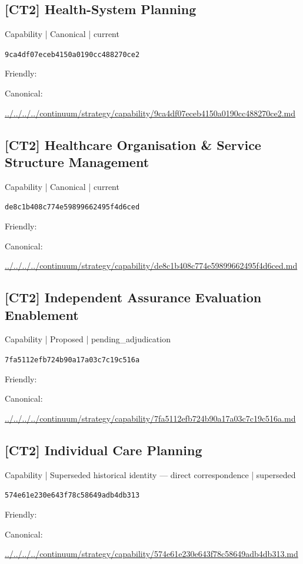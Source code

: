 \documentclass[10pt,a4paper]{article}
\begin{document}
\subsection*{[CT2] Health-System Planning}
{\small Capability | Canonical | current}\par
\texttt{9ca4df07eceb4150a0190cc488270ce2}\par
Friendly: \par
Canonical: \par
{\footnotesize\url{../../../../continuum/strategy/capability/9ca4df07eceb4150a0190cc488270ce2.md}}\par
\subsection*{[CT2] Healthcare Organisation \& Service Structure Management}
{\small Capability | Canonical | current}\par
\texttt{de8c1b408c774e59899662495f4d6ced}\par
Friendly: \par
Canonical: \par
{\footnotesize\url{../../../../continuum/strategy/capability/de8c1b408c774e59899662495f4d6ced.md}}\par
\subsection*{[CT2] Independent Assurance Evaluation Enablement}
{\small Capability | Proposed | pending\_adjudication}\par
\texttt{7fa5112efb724b90a17a03c7c19c516a}\par
Friendly: \par
Canonical: \par
{\footnotesize\url{../../../../continuum/strategy/capability/7fa5112efb724b90a17a03c7c19c516a.md}}\par
\subsection*{[CT2] Individual Care Planning}
{\small Capability | Superseded historical identity — direct correspondence | superseded}\par
\texttt{574e61e230e643f78c58649adb4db313}\par
Friendly: \par
Canonical: \par
{\footnotesize\url{../../../../continuum/strategy/capability/574e61e230e643f78c58649adb4db313.md}}\par
\end{document}

